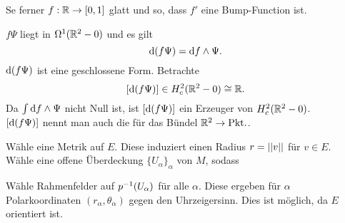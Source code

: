 Se ferner $f : \mathbb{R} \overset{}{\rightarrow} [0,1] $ glatt und so, dass $f'$ eine Bump-Function ist.

$f\Psi$ liegt in $\Omega^1(\mathbb{R}^2 - 0)$ und es gilt
\[ \text{d}(f\Psi) = \text{d} f \wedge \Psi. \]
$\text{d}(f \Psi)$ ist eine geschlossene Form. Betrachte
\[ [\text{d} (f\Psi) ] \in H_c^2(\mathbb{R}^2 - 0) \overset{}{\cong} \mathbb{R}. \]
Da $\int \text{d} f \wedge \Psi$ nicht Null ist, ist $[\text{d} (f\Psi) ]$ ein Erzeuger von $H_c^2(\mathbb{R}^2 - 0) $.\\
$[\text{d} (f\Psi) ]$  nennt man auch die  für das Bündel $\mathbb{R}^2 \overset{}{\rightarrow} \mathrm{Pkt.}$.


Wähle eine Metrik auf $E$. Diese induziert einen Radius $r = \left|\left|v\right|\right|$ für $v \in E$.\\
Wähle eine offene Überdeckung $\{U_\alpha\}_\alpha$ von $M$, sodass 
\begin{center}
\end{center}
Wähle Rahmenfelder auf $p^{-1}(U_\alpha)$ für alle $\alpha$. Diese ergeben für $\alpha$ Polarkoordinaten  $(r_\alpha, \theta_\alpha)$ gegen den Uhrzeigersinn. Dies ist möglich, da $E$ orientiert ist.